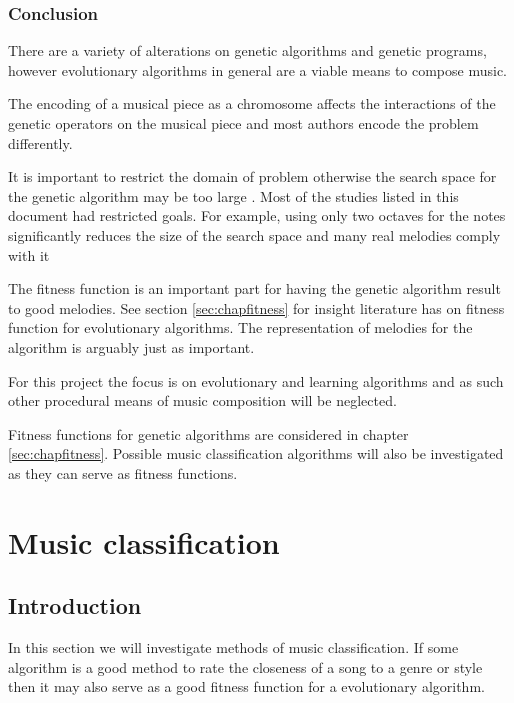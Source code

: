 \subsection{Conclusion}
There are a variety of alterations on genetic algorithms and genetic programs, however evolutionary algorithms in general are a viable means to compose music.

The encoding of a musical piece as a chromosome affects the interactions of the genetic operators on the musical piece and most authors encode the problem differently.

It is important to restrict the domain of problem otherwise the search space for the genetic algorithm may be too large \cite{Jacob1995}. Most of the studies listed in this document had restricted goals.
For example, using only two octaves for the notes significantly reduces the size of the search space and many real melodies comply with it \cite{Alfonseca2007}

The fitness function is an important part for having the genetic algorithm result to good melodies. See section \ref{sec:chapfitness} for insight literature has on fitness function for evolutionary algorithms.
The representation of melodies for the algorithm is arguably just as important.

For this project the focus is on evolutionary and learning algorithms and as such other procedural means of music composition will be neglected. 

Fitness functions for genetic algorithms are considered in chapter \ref{sec:chapfitness}. Possible music classification algorithms will also be investigated as they can serve as fitness functions.



\chapter{Music classification} \label{sec:music_class}
\section{Introduction}
In this section we will investigate methods of music classification. If some algorithm is a good method to rate the closeness of a song to a genre or style then it may also serve as a good fitness function for a evolutionary algorithm.


